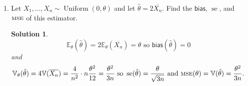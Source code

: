 \documentclass[10pt]{article}
\newtheorem*{sol}{Solution}
\newcommand{\V}{\mathbb{V}}
\newcommand{\E}{\mathbb{E}}
\newcommand{\Unif}{\operatorname{Uniform}}
\newcommand{\se}{\operatorname{se}}
\newcommand{\MSE}{\textsc{mse}}
\newcommand{\bias}{\mathsf{bias}}
\begin{document}
\begin{enumerate}
\item[(3)]
Let $X_1,\ldots,X_n \sim \Unif(0, \theta)$ and let $\hat\theta=2\overline{X_n}$.
Find the $\bias$, $\se$, and $\MSE$ of this estimator.

\begin{sol}
\[
\E_\theta(\hat\theta)=2\E_\theta(\overline{X_n})=\theta
\text{ so } \bias(\hat\theta) = 0
\]
and
\[
\V_\theta(\hat\theta) =
4\V(\overline{X_n})= \frac{4}{n^2} \cdot n\frac{\theta^2}{12} =
\frac{\theta^2}{3n} \text{ so } \se(\hat\theta) = \frac{\theta}{\sqrt{3n}}
\text{ and }
\MSE(\theta) = \V(\hat\theta)=\frac{\theta^2}{3n}.
\]
\end{sol}
\end{enumerate}
\end{document}
